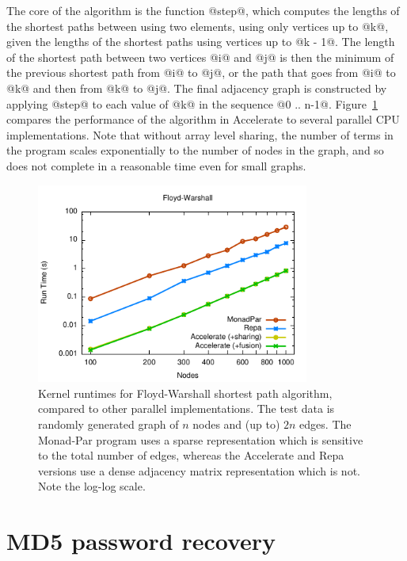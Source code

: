The core of the algorithm is the function @step@, which computes the lengths of
the shortest paths between using two elements, using only vertices up to @k@,
given the lengths of the shortest paths using vertices up to @k - 1@. The length
of the shortest path between two vertices @i@ and @j@ is then the minimum of the
previous shortest path from @i@ to @j@, or the path that goes from @i@ to @k@
and then from @k@ to @j@. The final adjacency graph is constructed by applying
@step@ to each value of @k@ in the sequence @0 .. n-1@.
Figure~\ref{fig:floyd_warshall} compares the performance of the algorithm in
Accelerate to several parallel CPU implementations. Note that without array
level sharing, the number of terms in the program scales exponentially to the
number of nodes in the graph, and so does not complete in a reasonable time even
for small graphs.

\begin{figure}
    \centering
    \includegraphics[width=0.8\textwidth]{images/results/floyd-warshall/floyd-warshall}
    \caption[Floyd-Warshall shortest path benchmark]{Kernel runtimes for
    Floyd-Warshall shortest path algorithm, compared to other parallel
    implementations. The test data is randomly generated graph of $n$ nodes and
    (up to) $2n$ edges. The Monad-Par program uses a sparse representation which
    is sensitive to the total number of edges, whereas the Accelerate and Repa
    versions use a dense adjacency matrix representation which is not. Note
    the log-log scale.}
    \label{fig:floyd_warshall}
\end{figure}


\section{MD5 password recovery}

